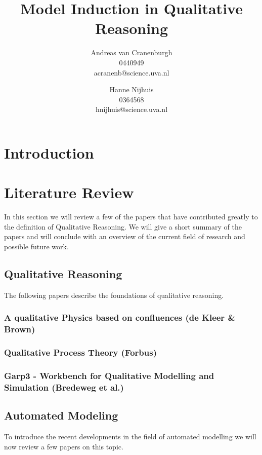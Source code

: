 \documentclass{article}
\title{Model Induction in Qualitative Reasoning}
\author{Andreas van Cranenburgh \\ 0440949 \\ acranenb@science.uva.nl 
\and Hanne Nijhuis \\ 0364568 \\ hnijhuis@science.uva.nl}
\begin{document}
\maketitle

\begin{abstract}
\end{abstract}

\section{Introduction}

\section{Literature Review}
In this section we will review a few of the papers that have contributed
greatly to the definition of Qualitative Reasoning. We will give a short
summary of the papers and will conclude with an overview of the current field
of research and possible future work.

\subsection{Qualitative Reasoning}
The following papers describe the foundations of qualitative reasoning.

\subsubsection{A qualitative Physics based on confluences (de Kleer \& Brown)}

\subsubsection{Qualitative Process Theory (Forbus)}

\subsubsection{Garp3 - Workbench for Qualitative Modelling and Simulation (Bredeweg et al.)}

\subsection{Automated Modeling}

To introduce the recent developments in the field of automated modelling we
will now review a few papers on this topic.
\end{document}

